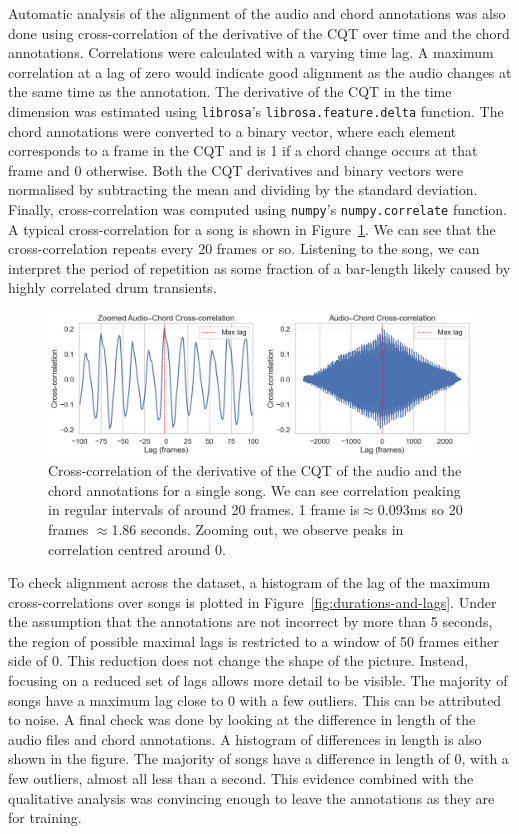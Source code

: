 Automatic analysis of the alignment of the audio and chord annotations was also done using cross-correlation of the derivative of the CQT over time and the chord annotations. Correlations were calculated with a varying time lag. A maximum correlation at a lag of zero would indicate good alignment as the audio changes at the same time as the annotation. The derivative of the CQT in the time dimension was estimated using \texttt{librosa}'s \texttt{librosa.feature.delta} function. The chord annotations were converted to a binary vector, where each element corresponds to a frame in the CQT and is 1 if a chord change occurs at that frame and 0 otherwise. Both the CQT derivatives and binary vectors were normalised by subtracting the mean and dividing by the standard deviation. Finally, cross-correlation was computed using \texttt{numpy}'s \texttt{numpy.correlate} function. A typical cross-correlation for a song is shown in Figure~\ref{fig:cross-correlation}. We can see that the cross-correlation repeats every 20 frames or so. Listening to the song, we can interpret the period of repetition as some fraction of a bar-length likely caused by highly correlated drum transients. 

\begin{figure}[H]
    \centering
    \includegraphics[width=1.0\textwidth]{figures/cross_correlation.png}
    \caption{Cross-correlation of the derivative of the CQT of the audio and the chord annotations for a single song. We can see correlation peaking in regular intervals of around 20 frames. 1 frame is$\approx 0.093$ms so 20 frames $\approx$1.86 seconds. Zooming out, we observe peaks in correlation centred around 0.}\label{fig:cross-correlation}
\end{figure}

To check alignment across the dataset, a histogram of the lag of the maximum cross-correlations over songs is plotted in Figure~\ref{fig:durations-and-lags}. Under the assumption that the annotations are not incorrect by more than 5 seconds, the region of possible maximal lags is restricted to a window of 50 frames either side of 0. This reduction does not change the shape of the picture. Instead, focusing on a reduced set of lags allows more detail to be visible. The majority of songs have a maximum lag close to 0 with a few outliers. This can be attributed to noise. A final check was done by looking at the difference in length of the audio files and chord annotations. A histogram of differences in length is also shown in the figure. The majority of songs have a difference in length of 0, with a few outliers, almost all less than a second. This evidence combined with the qualitative analysis was convincing enough to leave the annotations as they are for training.

